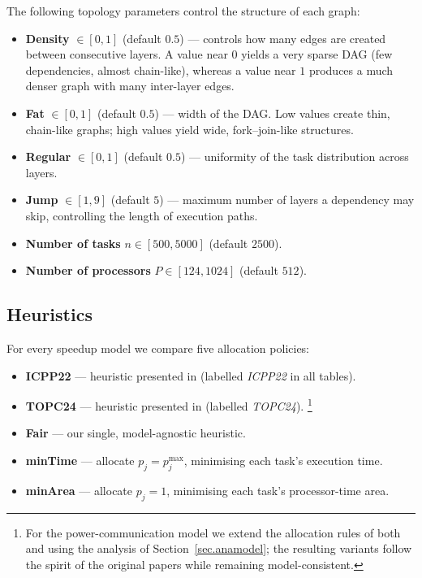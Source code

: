 \documentclass{article}
\begin{document}
The following topology parameters control the structure of each graph:
\begin{itemize}
    \item \textbf{Density} $\in[0,1]$ (default $0.5$) — controls how many edges are created between consecutive layers.
          A value near $0$ yields a very sparse DAG (few dependencies,
          almost chain-like), whereas a value near $1$ produces a much denser
          graph with many inter-layer edges.
    \item \textbf{Fat} $\in[0,1]$ (default $0.5$) — width of the DAG.
          Low values create thin, chain-like graphs; high values yield
          wide, fork–join-like structures.
    \item \textbf{Regular} $\in[0,1]$ (default $0.5$) — uniformity of the task
          distribution across layers.
    \item \textbf{Jump} $\in[1,9]$ (default $5$) — maximum number of layers a
          dependency may skip, controlling the length of execution paths.
    \item \textbf{Number of tasks} $n\in[500,5000]$ (default $2500$).
    \item \textbf{Number of processors} $P\in[124,1024]$ (default $512$).
\end{itemize}

\subsection{Heuristics}
\label{sec:heuristics}

For every speedup model we compare five allocation policies:
\begin{itemize}
    \item \textbf{ICPP22} — heuristic presented in
          \cite{ICPP22} (labelled \emph{ICPP22} in all tables).
    \item \textbf{TOPC24} — heuristic presented in
          \cite{TOPC24} (labelled \emph{TOPC24}).
          \footnote{For the power-communication model we extend the
          allocation rules of both \cite{ICPP22} and \cite{TOPC24} using the
          analysis of Section~\ref{sec.anamodel}; the resulting variants follow
          the spirit of the original papers while remaining model-consistent.}
    \item \textbf{Fair} — our single, model-agnostic heuristic.
    \item \textbf{minTime} — allocate \(p_j=p_j^{\max}\), minimising each
          task’s execution time.
    \item \textbf{minArea} — allocate \(p_j=1\), minimising each
          task’s processor-time area.
\end{itemize}
\end{document}
